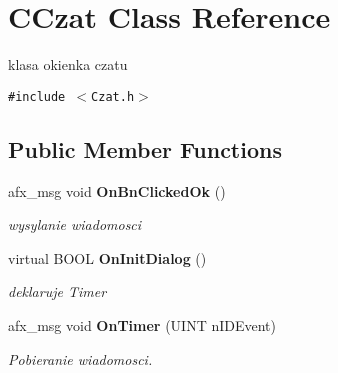 \section{CCzat Class Reference}
\label{class_c_czat}
klasa okienka czatu  


{\tt \#include $<$Czat.h$>$}

\subsection*{Public Member Functions}
\begin{CompactItemize}
\item 
afx\_\-msg void {\bf OnBnClickedOk} ()
\begin{CompactList}\small\item\em wysylanie wiadomosci \item\end{CompactList}\item 
virtual BOOL {\bf OnInitDialog} ()\label{class_c_czat_8acc9cab1761b6918d1b4fffda99bc79}

\begin{CompactList}\small\item\em deklaruje Timer \item\end{CompactList}\item 
afx\_\-msg void {\bf OnTimer} (UINT nIDEvent)
\begin{CompactList}\small\item\em Pobieranie wiadomosci. \item\end{CompactList}\end{CompactItemize}
